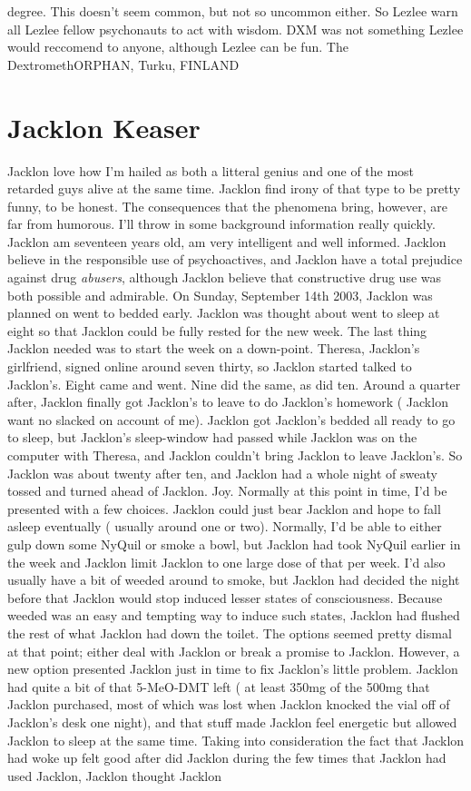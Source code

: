 \documentclass[12pt]{book}
\begin{document}
degree. This doesn't seem common, but not so uncommon either. So Lezlee warn all Lezlee fellow psychonauts to act with wisdom. DXM was not something Lezlee would reccomend to anyone, although Lezlee can be fun. The DextromethORPHAN, Turku, FINLAND



\chapter{Jacklon Keaser}

Jacklon love how I'm hailed as both a litteral genius and one of the most retarded guys alive at the same time. Jacklon find irony of that type to be pretty funny, to be honest. The consequences that the phenomena bring, however, are far from humorous. I'll throw in some background information really quickly. Jacklon am seventeen years old, am very intelligent and well informed. Jacklon believe in the responsible use of psychoactives, and Jacklon have a total prejudice against drug \emph{abusers}, although Jacklon believe that constructive drug use was both possible and admirable. On Sunday, September 14th 2003, Jacklon was planned on went to bedded early. Jacklon was thought about went to sleep at eight so that Jacklon could be fully rested for the new week. The last thing Jacklon needed was to start the week on a down-point. Theresa, Jacklon's girlfriend, signed online around seven thirty, so Jacklon started talked to Jacklon's. Eight came and went. Nine did the same, as did ten. Around a quarter after, Jacklon finally got Jacklon's to leave to do Jacklon's homework ( Jacklon want no slacked on account of me). Jacklon got Jacklon's bedded all ready to go to sleep, but Jacklon's sleep-window had passed while Jacklon was on the computer with Theresa, and Jacklon couldn't bring Jacklon to leave Jacklon's. So Jacklon was about twenty after ten, and Jacklon had a whole night of sweaty tossed and turned ahead of Jacklon. Joy. Normally at this point in time, I'd be presented with a few choices. Jacklon could just bear Jacklon and hope to fall asleep eventually ( usually around one or two). Normally, I'd be able to either gulp down some NyQuil or smoke a bowl, but Jacklon had took NyQuil earlier in the week and Jacklon limit Jacklon to one large dose of that per week. I'd also usually have a bit of weeded around to smoke, but Jacklon had decided the night before that Jacklon would stop induced lesser states of consciousness. Because weeded was an easy and tempting way to induce such states, Jacklon had flushed the rest of what Jacklon had down the toilet. The options seemed pretty dismal at that point; either deal with Jacklon or break a promise to Jacklon. However, a new option presented Jacklon just in time to fix Jacklon's little problem. Jacklon had quite a bit of that 5-MeO-DMT left ( at least 350mg of the 500mg that Jacklon purchased, most of which was lost when Jacklon knocked the vial off of Jacklon's desk one night), and that stuff made Jacklon feel energetic but allowed Jacklon to sleep at the same time. Taking into consideration the fact that Jacklon had woke up felt good after did Jacklon during the few times that Jacklon had used Jacklon, Jacklon thought Jacklon 
\end{document}
